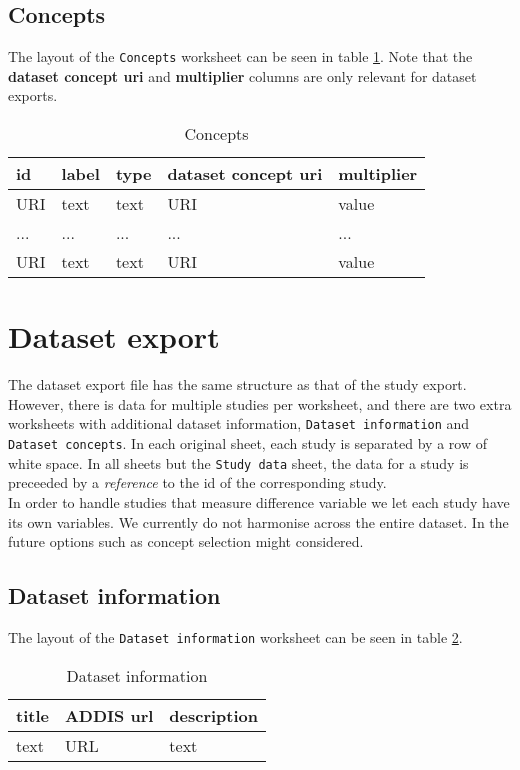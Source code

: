 \documentclass[a4paper,10pt]{article}
\begin{document}
\subsection*{Concepts}
The layout of the \texttt{Concepts} worksheet can be seen in table \ref{table:Concepts}. Note that the \textbf{dataset concept uri} and \textbf{multiplier} columns are only relevant for dataset exports.
\begin{table}[!h]
  \centering
  \caption{Concepts}
  \label{table:Concepts}
  \begin{tabular}{|l|l|l|l|l|}
    \hline
    \textbf{id} & \textbf{label} & \textbf{type} & \textbf{dataset concept uri} & \textbf{multiplier} \\ \hline
    URI         & text           & text          & URI                          & value               \\ \hline
    ...         & ...            & ...           & ...                          & ...                 \\ \hline
    URI         & text           & text          & URI                          & value               \\ \hline
  \end{tabular}
\end{table}

\section*{Dataset export}
The dataset export file has the same structure as that of the study export. However, there is data for multiple studies per worksheet, and there are two extra worksheets with additional dataset information, \texttt{Dataset information} and \texttt{Dataset concepts}. In each original sheet, each study is separated by a row of white space. In all sheets but the \texttt{Study data} sheet, the data for a study is preceeded by a \textit{reference} to the id of the corresponding study.\\
In order to handle studies that measure difference variable we let each study have its own variables. We currently do not harmonise across the entire dataset. In the future options such as concept selection might considered.

\subsection*{Dataset information}
The layout of the \texttt{Dataset information} worksheet can be seen in table \ref{table:Dataset information}.
\begin{table}[!h]
  \centering
  \caption{Dataset information}
  \label{table:Dataset information}
  \begin{tabular}{|l|l|l|}
    \hline
    \textbf{title} & \textbf{ADDIS url} & \textbf{description} \\ \hline
    text           & URL                & text                 \\ \hline
  \end{tabular}
\end{table}
\end{document}
